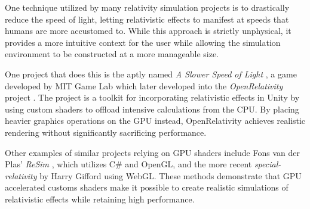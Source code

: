 \documentclass[a4paper]{article}
\begin{document}
One technique utilized by many relativity simulation projects is to drastically reduce the speed of light, letting relativistic effects to manifest at speeds that humans are more accustomed to. While this approach is strictly unphysical, it provides a more intuitive context for the user while allowing the simulation environment to be constructed at a more manageable size.

One project that does this is the aptly named \textit{A Slower Speed of Light} \cite{slower}, a game developed by MIT Game Lab which later developed into the \textit{OpenRelativity} project \cite{open-rel}. The project is a toolkit for incorporating relativistic effects in Unity by using custom shaders to offload intensive calculations from the CPU. By placing heavier graphics operations on the GPU instead, OpenRelativity achieves realistic rendering without significantly sacrificing performance.

Other examples of similar projects relying on GPU shaders include Fons van der Plas' \textit{ReSim} \cite{resim}, which utilizes C\# and OpenGL, and the more recent \textit{special-relativity} by Harry Gifford \cite{harry} using WebGL. These methods demonstrate that GPU accelerated customs shaders make it possible to create realistic simulations of relativistic effects while retaining high performance. 



\end{document}
